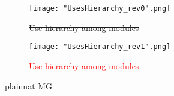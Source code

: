 \documentclass[12pt, titlepage]{article}
\begin{document}
\begin{figure}[H]
    \centering
    \texttt{[image: "UsesHierarchy\_rev0".png]}
    \caption{\sout{Use hierarchy among modules}}
    \label{FigUH}
\end{figure}

\begin{figure}[H]
    \centering
    \texttt{[image: "UsesHierarchy\_rev1".png]}
    \caption{\textcolor{red}{Use hierarchy among modules}}
    \label{FigUH}
\end{figure}


 {plainnat}
 {MG}
\end{document}
